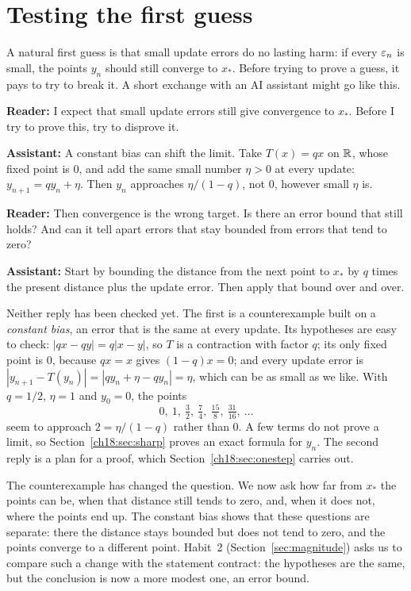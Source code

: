 \section{Testing the first guess}\label{ch18:sec:guess}
A natural first guess is that small update errors do no lasting harm: if every $\varepsilon_n$ is small, the points $y_n$ should still converge to $x_*$. Before trying to prove a guess, it pays to try to break it. A short exchange with an AI assistant might go like this.

\textbf{Reader:} I expect that small update errors still give convergence to $x_*$. Before I try to prove this, try to disprove it.

\textbf{Assistant:} A constant bias can shift the limit. Take $T(x)=qx$ on $\mathbb R$, whose fixed point is $0$, and add the same small number $\eta>0$ at every update: $y_{n+1}=qy_n+\eta$. Then $y_n$ approaches $\eta/(1-q)$, not $0$, however small $\eta$ is.

\textbf{Reader:} Then convergence is the wrong target. Is there an error bound that still holds? And can it tell apart errors that stay bounded from errors that tend to zero?

\textbf{Assistant:} Start by bounding the distance from the next point to $x_*$ by $q$ times the present distance plus the update error. Then apply that bound over and over.

Neither reply has been checked yet. The first is a counterexample built on a \emph{constant bias}, an error that is the same at every update. Its hypotheses are easy to check: $|qx-qy|=q|x-y|$, so $T$ is a contraction with factor $q$; its only fixed point is $0$, because $qx=x$ gives $(1-q)x=0$; and every update error is $|y_{n+1}-T(y_n)|=|qy_n+\eta-qy_n|=\eta$, which can be as small as we like. With $q=1/2$, $\eta=1$ and $y_0=0$, the points
\[
 0,\ 1,\ \tfrac32,\ \tfrac74,\ \tfrac{15}8,\ \tfrac{31}{16},\ \ldots
\]
seem to approach $2=\eta/(1-q)$ rather than $0$. A few terms do not prove a limit, so Section~\ref{ch18:sec:sharp} proves an exact formula for $y_n$. The second reply is a plan for a proof, which Section~\ref{ch18:sec:onestep} carries out.

The counterexample has changed the question. We now ask how far from $x_*$ the points can be, when that distance still tends to zero, and, when it does not, where the points end up. The constant bias shows that these questions are separate: there the distance stays bounded but does not tend to zero, and the points converge to a different point. Habit~2 (Section~\ref{sec:magnitude}) asks us to compare such a change with the statement contract: the hypotheses are the same, but the conclusion is now a more modest one, an error bound.

